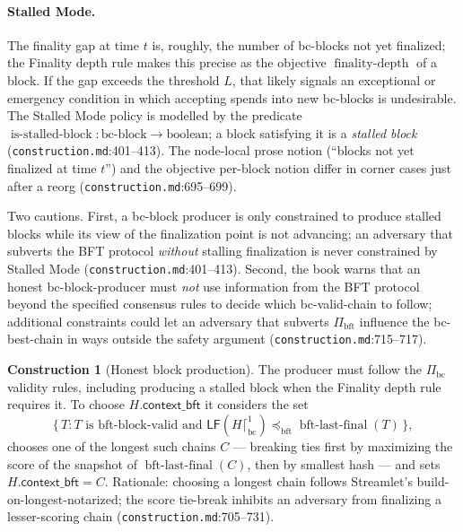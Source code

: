 \documentclass[11pt,a4paper]{article}
\theoremstyle{definition}
\newtheorem{construction}[theorem]{Construction}
\begin{document}
\paragraph{Stalled Mode.} The finality gap at time $t$ is, roughly, the
number of bc-blocks not yet finalized; the Finality depth rule makes this
precise as the objective $\operatorname{finality\text{-}depth}$ of a
block. If the gap exceeds the threshold $L$, that likely signals an
exceptional or emergency condition in which accepting spends into new
bc-blocks is undesirable. The Stalled Mode policy is modelled by the
predicate $\operatorname{is\text{-}stalled\text{-}block} :
\text{bc-block} \to \mathrm{boolean}$; a block satisfying it is a
\emph{stalled block} (\texttt{construction.md}:401--413). The node-local
prose notion (``blocks not yet finalized at time $t$'') and the objective
per-block notion differ in corner cases just after a reorg
(\texttt{construction.md}:695--699).

Two cautions. First, a bc-block producer is only constrained to produce
stalled blocks while its view of the finalization point is not advancing;
an adversary that subverts the BFT protocol \emph{without} stalling
finalization is never constrained by Stalled Mode
(\texttt{construction.md}:401--413). Second, the book warns that an
honest bc-block-producer must \emph{not} use information from the BFT
protocol beyond the specified consensus rules to decide which
bc-valid-chain to follow; additional constraints could let an adversary
that subverts $\Pi_{\mathrm{bft}}$ influence the bc-best-chain in ways
outside the safety argument (\texttt{construction.md}:715--717).

\begin{construction}[Honest block production]\label{def:xl-honest-production}
The producer must follow the $\Pi_{\mathrm{bc}}$ validity rules,
including producing a stalled block when the Finality depth rule requires
it. To choose $H.\mathsf{context\_bft}$ it considers the set
\[
\{\, T : T \text{ is bft-block-valid and }
  \mathsf{LF}(H \lceil^{1}_{\mathrm{bc}}) \preceq_{\mathrm{bft}}
  \operatorname{bft\text{-}last\text{-}final}(T) \,\},
\]
chooses one of the longest such chains $C$ --- breaking ties first by
maximizing the score of the snapshot of
$\operatorname{bft\text{-}last\text{-}final}(C)$, then by smallest hash
--- and sets $H.\mathsf{context\_bft} = C$.
Rationale: choosing a longest chain follows Streamlet's
build-on-longest-notarized; the score tie-break inhibits an adversary
from finalizing a lesser-scoring chain
(\texttt{construction.md}:705--731).
\end{construction}
\end{document}

